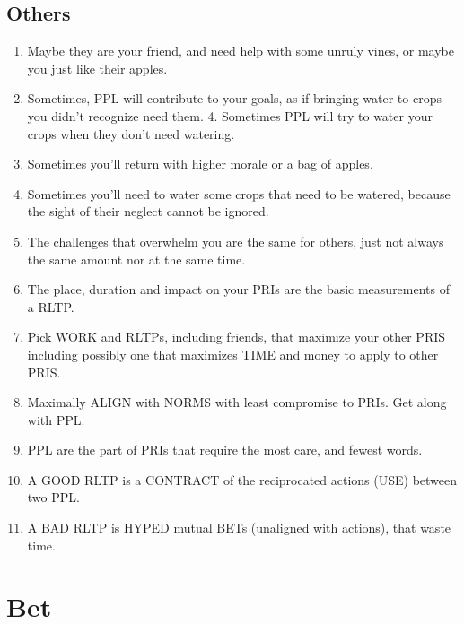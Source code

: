 \documentclass[
]{book}
\begin{document}
\hypertarget{others}{%
\section{Others}\label{others}}

\begin{enumerate}
\def\labelenumi{\arabic{enumi}.}
\setcounter{enumi}{26}
\item
  Maybe they are your friend, and need help with some unruly vines, or maybe you just like their apples.
\item
  Sometimes, PPL will contribute to your goals, as if bringing water to crops you didn't recognize need them. 4. Sometimes PPL will try to water your crops when they don't need watering.
\item
  Sometimes you'll return with higher morale or a bag of apples.
\item
  Sometimes you'll need to water some crops that need to be watered, because the sight of their neglect cannot be ignored.
\item
  The challenges that overwhelm you are the same for others, just not always the same amount nor at the same time.
\item
  The place, duration and impact on your PRIs are the basic measurements of a RLTP.
\item
  Pick WORK and RLTPs, including friends, that maximize your other PRIS including possibly one that maximizes TIME and money to apply to other PRIS.
\item
  Maximally ALIGN with NORMS with least compromise to PRIs. Get along with PPL.
\item
  PPL are the part of PRIs that require the most care, and fewest words.
\item
  A GOOD RLTP is a CONTRACT of the reciprocated actions (USE) between two PPL.
\item
  A BAD RLTP is HYPED mutual BETs (unaligned with actions), that waste time.
\end{enumerate}

\hypertarget{bet}{%
\chapter{Bet}\label{bet}}
\end{document}
